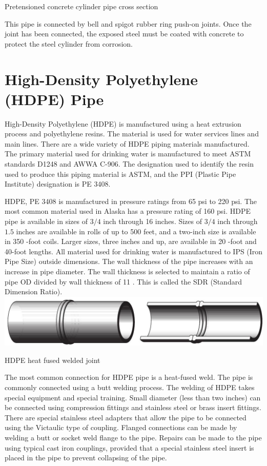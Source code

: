 \documentclass[10pt]{article}
\begin{document}
Pretensioned concrete cylinder pipe cross section

This pipe is connected by bell and spigot rubber ring push-on joints. Once the joint has been connected, the exposed steel must be coated with concrete to protect the steel cylinder from corrosion.

\section{High-Density Polyethylene (HDPE) Pipe}
High-Density Polyethylene (HDPE) is manufactured using a heat extrusion process and polyethylene resins. The material is used for water services lines and main lines. There are a wide variety of HDPE piping materials manufactured. The primary material used for drinking water is manufactured to meet ASTM standards D1248 and AWWA C-906. The designation used to identify the resin used to produce this piping material is ASTM, and the PPI (Plastic Pipe Institute) designation is PE 3408.

HDPE, PE 3408 is manufactured in pressure ratings from 65 psi to 220 psi. The most common material used in Alaska has a pressure rating of 160 psi. HDPE pipe is available in sizes of $3 / 4$ inch through 16 inches. Sizes of $3 / 4$ inch through $1.5$ inches are available in rolls of up to 500 feet, and a two-inch size is available in 350 -foot coils. Larger sizes, three inches and up, are available in 20 -foot and 40-foot lengths. All material used for drinking water is manufactured to IPS (Iron Pipe Size) outside dimensions. The wall thickness of the pipe increases with an increase in pipe diameter. The wall thickness is selected to maintain a ratio of pipe OD divided by wall thickness of 11 . This is called the SDR (Standard Dimension Ratio).\\

\includegraphics[max width=\textwidth]{HDPEFuseWeldJoint}

HDPE heat fused welded joint

The most common connection for HDPE pipe is a heat-fused weld. The pipe is commonly connected using a butt welding process. The welding of HDPE takes special equipment and special training. Small diameter (less than two inches) can be connected using compression fittings and stainless steel or brass insert fittings. There are special stainless steel adapters that allow the pipe to be connected using the Victaulic type of coupling. Flanged connections can be made by welding a butt or socket weld flange to the pipe. Repairs can be made to the pipe using typical cast iron couplings, provided that a special stainless steel insert is placed in the pipe to prevent collapsing of the pipe.
\end{document}
